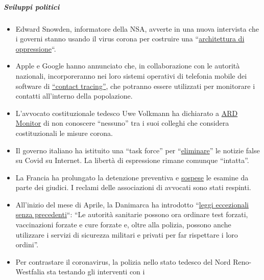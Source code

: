 \hypertarget{sviluppi-politici-1}{%
\subparagraph{\texorpdfstring{\textbf{Sviluppi
politici}}{Sviluppi politici}}\label{sviluppi-politici-1}}

\begin{itemize}
\tightlist
\item
  Edward Snowden, informatore della NSA, avverte in una nuova intervista
  che i governi stanno usando il virus corona per costruire una
  ``\href{https://www.vice.com/en_us/article/bvge5q/snowden-warns-governments-are-using-coronavirus-to-build-the-architecture-of-oppression}{architettura
  di oppressione}``.
\item
  Apple e Google hanno annunciato che, in collaborazione con le autorità
  nazionali, incorporeranno nei loro sistemi operativi di telefonia
  mobile dei software di
  \href{https://www.bloomberg.com/news/articles/2020-04-10/apple-google-bring-covid-19-contact-tracing-to-3-billion-people}{``contact
  tracing''}, che potranno essere utilizzati per monitorare i contatti
  all'interno della popolazione.
\item
  L'avvocato costituzionale tedesco Uwe Volkmann ha dichiarato a
  \href{https://www.youtube.com/watch?v=DvzrGLvzllU}{ARD Monitor} di non
  conoscere ``nessuno'' tra i suoi colleghi che considera costituzionali
  le misure corona.
\item
  Il governo italiano ha istituito una ``task force'' per
  ``\href{https://www.faz.net/aktuell/feuilleton/medien/corona-in-italien-das-virus-und-die-wahrheit-16714529.html}{eliminare}''
  le notizie false su Covid su Internet. La libertà di espressione
  rimane comunque ``intatta''.
\item
  La Francia ha prolungato la detenzione preventiva e
  \href{https://www.lefigaro.fr/politique/coronavirus-le-conseil-d-etat-sur-la-ligne-de-crete-des-libertes-publiques-20200406}{sospese}
  le esamine da parte dei giudici. I reclami delle associazioni di
  avvocati sono stati respinti.
\item
  All'inizio del mese di Aprile, la Danimarca ha introdotto
  ``\href{https://www.fr.de/politik/coronavirus-sars-cov-2-daenemark-notfalls-militaer-13598503.html}{leggi
  eccezionali senza precedenti}``: ``Le autorità sanitarie possono ora
  ordinare test forzati, vaccinazioni forzate e cure forzate e, oltre
  alla polizia, possono anche utilizzare i servizi di sicurezza militari
  e privati ​​per far rispettare i loro ordini''.
\item
  Per contrastare il coronavirus, la polizia nello stato tedesco del
  Nord Reno-Westfalia sta testando gli interventi con i

\end{itemize}
